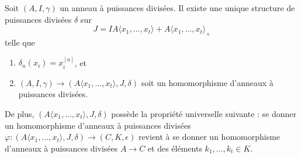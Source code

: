 \begin{lemma}
\label{lemma-divided-power-polynomial-algebra}
Soit $(A, I, \gamma)$ un anneau à puissances divisées.
Il existe une unique structure de puissances divisées $\delta$ sur
$$
J = IA\langle x_1, \ldots, x_t \rangle + A\langle x_1, \ldots, x_t \rangle_{+}
$$
telle que
\begin{enumerate}
\item $\delta_n(x_i) = x_i^{[n]}$, et
\item $(A, I, \gamma) \to (A\langle x_1, \ldots, x_t \rangle, J, \delta)$
soit un homomorphisme d'anneaux à puissances divisées.
\end{enumerate}
De plus, $(A\langle x_1, \ldots, x_t \rangle, J, \delta)$ possède la
propriété universelle suivante : se donner un homomorphisme d'anneaux à
puissances divisées
$\varphi : (A\langle x_1, \ldots, x_t \rangle, J, \delta) \to
(C, K, \epsilon)$ revient à se donner un homomorphisme d'anneaux à
puissances divisées $A \to C$ et des éléments
$k_1, \ldots, k_t \in K$.
\end{lemma}

